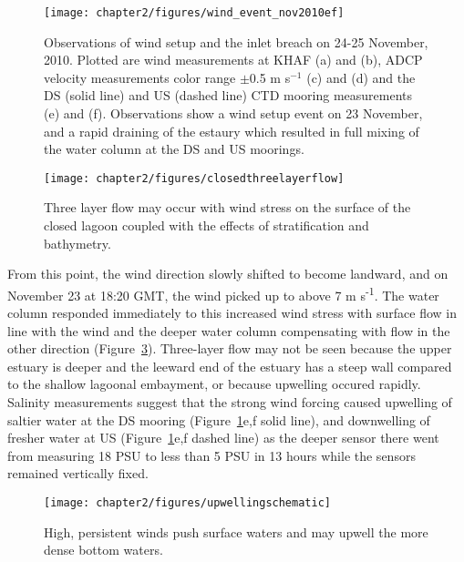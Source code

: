 \begin{figure}[t]
	\centering
	\texttt{[image: chapter2/figures/wind\_event\_nov2010ef]}
\caption{Observations of wind setup and the inlet breach on 24-25 November, 2010. Plotted are wind measurements at KHAF (a) and (b), ADCP velocity measurements color range $\pm $0.5 m s$^{-1}$ (c) and (d) and the DS (solid line) and US (dashed line) CTD mooring measurements (e) and (f). Observations show a wind setup event on 23 November, and a rapid draining of the estaury which resulted in full mixing of the water column at the DS and US moorings.}
\label{fig:closed_UVwindsalt}
\end{figure}


\begin{figure}
	\centering
	\texttt{[image: chapter2/figures/closedthreelayerflow]}
\caption{Three layer flow may occur with wind stress on the surface of the closed lagoon coupled with the effects of stratification and bathymetry.} \label{fig:schematic3lf}
\end{figure}


From this point, the wind direction slowly shifted to become landward, and on November 23 at 18:20 GMT, the wind picked up to above 7 m s\textsuperscript{-1}. The water column responded immediately to this increased wind stress with surface flow in line with the wind and the  deeper water column compensating with flow in the other direction (Figure~\ref{fig:schematicupwelling}). Three-layer flow may not be seen because the upper estuary is deeper and the leeward end of the estuary has a steep wall compared to the shallow lagoonal embayment, or because upwelling occured rapidly. Salinity measurements suggest that the strong wind forcing caused upwelling of saltier water at the DS mooring (Figure~\ref{fig:closed_UVwindsalt}e,f solid line), and downwelling of fresher water at US (Figure~\ref{fig:closed_UVwindsalt}e,f dashed line) as the deeper sensor there went from measuring 18 PSU to less than 5 PSU in 13 hours while the sensors remained vertically fixed.


\begin{figure}
\centering
	\texttt{[image: chapter2/figures/upwellingschematic]}
\caption{High, persistent winds push surface waters and may upwell the more dense bottom waters.} \label{fig:schematicupwelling}
\end{figure}

